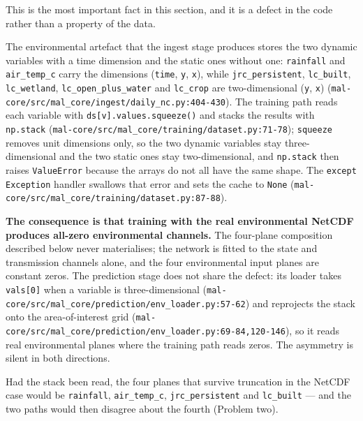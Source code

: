 \documentclass[11pt,a4paper]{article}
\newcommand{\codex}[1]{\texttt{#1}}
\begin{document}
This is the most important fact in this section, and it is a defect in the
code rather than a property of the data.

The environmental artefact that the ingest stage produces stores the two
dynamic variables with a time dimension and the static ones without one:
\codex{rainfall} and \codex{air\_\allowbreak{}temp\_\allowbreak{}c} carry the dimensions
(\codex{time}, \codex{y}, \codex{x}), while \codex{jrc\_\allowbreak{}persistent},
\codex{lc\_\allowbreak{}built}, \codex{lc\_\allowbreak{}wetland},
\codex{lc\_\allowbreak{}open\_\allowbreak{}plus\_\allowbreak{}water} and \codex{lc\_\allowbreak{}crop} are
two-dimensional (\codex{y}, \codex{x})
(\codex{mal-core/\allowbreak{}src/\allowbreak{}mal\_\allowbreak{}core/\allowbreak{}ingest/\allowbreak{}daily\_\allowbreak{}nc.py:404-430}). The
training path reads each variable with \codex{ds[v].values.squeeze()} and
stacks the results with \codex{np.stack}
(\codex{mal-core/\allowbreak{}src/\allowbreak{}mal\_\allowbreak{}core/\allowbreak{}training/\allowbreak{}dataset.py:71-78}); \codex{squeeze}
removes unit dimensions only, so the two dynamic variables stay
three-dimensional and the two static ones stay two-dimensional, and
\codex{np.stack} then raises \codex{ValueError} because the arrays do not
all have the same shape. The \codex{except Exception} handler swallows that
error and sets the cache to \codex{None}
(\codex{mal-core/\allowbreak{}src/\allowbreak{}mal\_\allowbreak{}core/\allowbreak{}training/\allowbreak{}dataset.py:87-88}).

\textbf{The consequence is that training with the real environmental NetCDF
produces all-zero environmental channels.} The four-plane composition
described below never materialises; the network is fitted to the state and
transmission channels alone, and the four environmental input planes are
constant zeros. The prediction stage does not share the defect: its loader
takes \codex{vals[0]} when a variable is three-dimensional
(\codex{mal-core/\allowbreak{}src/\allowbreak{}mal\_\allowbreak{}core/\allowbreak{}prediction/\allowbreak{}env\_\allowbreak{}loader.py:57-62}) and
reprojects the stack onto the area-of-interest grid
(\codex{mal-core/\allowbreak{}src/\allowbreak{}mal\_\allowbreak{}core/\allowbreak{}prediction/\allowbreak{}env\_\allowbreak{}loader.py:69-84,120-146}), so
it reads real environmental planes where the training path reads zeros. The
asymmetry is silent in both directions.

Had the stack been read, the four planes that survive truncation in the
NetCDF case would be \codex{rainfall}, \codex{air\_\allowbreak{}temp\_\allowbreak{}c},
\codex{jrc\_\allowbreak{}persistent} and \codex{lc\_\allowbreak{}built} --- and the two paths
would then disagree about the fourth (Problem two).
\end{document}

